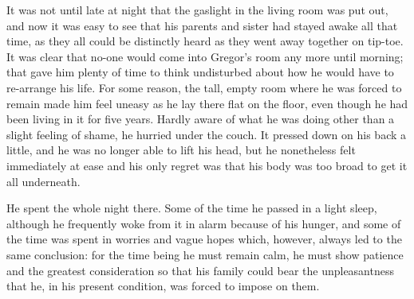 \documentclass[12pt]{report}
\begin{document}
It was not until late at night that the gaslight in the living room was
put out, and now it was easy to see that his parents and sister had
stayed awake all that time, as they all could be distinctly heard as
they went away together on tip-toe. It was clear that no-one would come
into Gregor's room any more until morning; that gave him plenty of time
to think undisturbed about how he would have to re-arrange his life. For
some reason, the tall, empty room where he was forced to remain made him
feel uneasy as he lay there flat on the floor, even though he had been
living in it for five years. Hardly aware of what he was doing other
than a slight feeling of shame, he hurried under the couch. It pressed
down on his back a little, and he was no longer able to lift his head,
but he nonetheless felt immediately at ease and his only regret was that
his body was too broad to get it all underneath.

He spent the whole night there. Some of the time he passed in a light
sleep, although he frequently woke from it in alarm because of his
hunger, and some of the time was spent in worries and vague hopes which,
however, always led to the same conclusion: for the time being he must
remain calm, he must show patience and the greatest consideration so
that his family could bear the unpleasantness that he, in his present
condition, was forced to impose on them.
\end{document}

